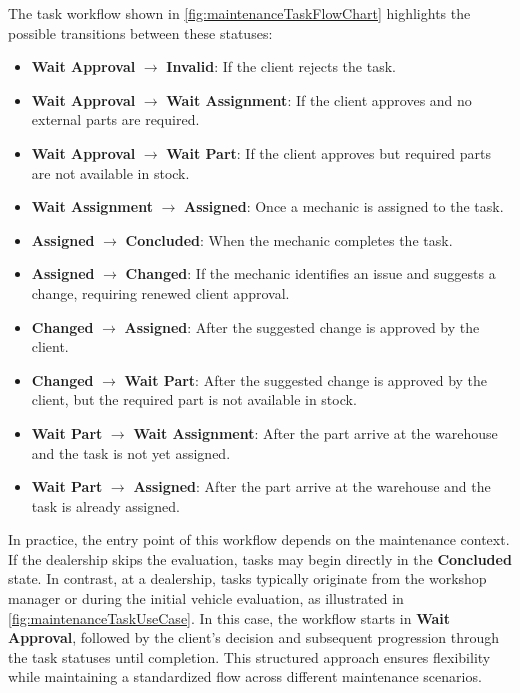 The task workflow shown in \ref{fig:maintenanceTaskFlowChart} highlights the possible transitions between these statuses:
\begin{itemize}
\item \textbf{Wait Approval} $\rightarrow$ \textbf{Invalid}: If the client rejects the task.
\item \textbf{Wait Approval} $\rightarrow$ \textbf{Wait Assignment}: If the client approves and no external parts are required.
\item \textbf{Wait Approval} $\rightarrow$ \textbf{Wait Part}: If the client approves but required parts are not available in stock.
\item \textbf{Wait Assignment} $\rightarrow$ \textbf{Assigned}: Once a mechanic is assigned to the task.
\item \textbf{Assigned} $\rightarrow$ \textbf{Concluded}: When the mechanic completes the task.
\item \textbf{Assigned} $\rightarrow$ \textbf{Changed}: If the mechanic identifies an issue and suggests a change, requiring renewed client approval.
\item \textbf{Changed} $\rightarrow$ \textbf{Assigned}: After the suggested change is approved by the client.
\item \textbf{Changed} $\rightarrow$ \textbf{Wait Part}: After the suggested change is approved by the client, but the required part is not available in stock.
\item \textbf{Wait Part} $\rightarrow$ \textbf{Wait Assignment}: After the part arrive at the warehouse and the task is not yet assigned. 
\item \textbf{Wait Part} $\rightarrow$ \textbf{Assigned}: After the part arrive at the warehouse and the task is already assigned. 

\end{itemize}

In practice, the entry point of this workflow depends on the maintenance context. If the dealership skips the evaluation, tasks may begin directly in the \textbf{Concluded} state. In contrast, at a dealership, tasks typically originate from the workshop manager or during the initial vehicle evaluation, as illustrated in \ref{fig:maintenanceTaskUseCase}. In this case, the workflow starts in \textbf{Wait Approval}, followed by the client's decision and subsequent progression through the task statuses until completion. This structured approach ensures flexibility while maintaining a standardized flow across different maintenance scenarios.



